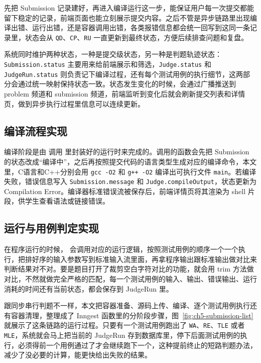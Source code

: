 先把 Submission 记录建好，再进入编译运行这一步，能保证用户每一次提交都能留下稳定的记录，前端页面也能立刻展示提交内容。之后不管是异步链路里出现编译出错、运行出错，还是容器调用出错，各类报错信息都会统一回写到这同一条记录里，状态会从 \texttt{QD}、\texttt{CP}、\texttt{RU} 一直更新到最终状态，方便后续排查问题和复盘。

系统同时维护两种状态，一种是提交级状态，另一种是判题轨迹状态：\texttt{Submission.status} 主要用来给前端展示和筛选，\texttt{Judge.status} 和 \texttt{JudgeRun.status} 则负责记下编译过程，还有每个测试用例的执行细节，这两部分会通过统一映射保持状态一致。状态发生变化的时候，会通过广播推送到 problem 频道和 submission 频道，前端监听到变化后就会刷新提交列表和详情页，做到异步执行过程里信息可以连续更新。

\subsection{编译流程实现}

编译阶段是由  调用  里封装好的运行时来完成的。调用的函数会先把 Submission 的状态改成“编译中”，之后再按照提交代码的语言类型生成对应的编译命令，本文里，C语言和C++分别会用 \texttt{gcc -O2} 和 \texttt{g++ -O2} 编译出可执行文件 \texttt{main}。若编译失败，错误信息写入 \texttt{Submission.message} 和 \texttt{Judge.compileOutput}，状态更新为 Compilation Error。编译器标准错误流被保存后，前端详情页将其渲染为 shell 片段，供学生查看语法或链接错误。

\subsection{运行与用例判定实现}

在程序运行的时候， 会调用对应的运行逻辑，按照测试用例的顺序一个一个执行，把排好序的输入参数写到标准输入流里面，再拿程序输出跟标准输出做对比来判断结果对不对。要是题目打开了裁剪空白字符对比的功能，就会用 trim 方法做对比，不然就做完全严格的匹配，每一个测试用例的输入、输出、错误输出、运行消耗的时间还有当前状态，都会保存到 JudgeRun 里。

跟同步串行判题不一样，本文把容器准备、源码上传、编译、逐个测试用例执行还有容器清理，整理成了 Inngest 函数里的分阶段步骤，图~\ref{fig:ch5-submission-list} 就展示了这条链路的运行过程。只要有一个测试用例跑出了 \texttt{WA}、\texttt{RE}、\texttt{TLE} 或者 \texttt{MLE}，系统就会马上把当前的 JudgeRun 存到数据库里，停下后面测试用例的执行，必须得前一个用例通过了才会继续跑下一个，这种提前终止的短路判题办法，减少了没必要的计算，能更快给出失败的结果。

